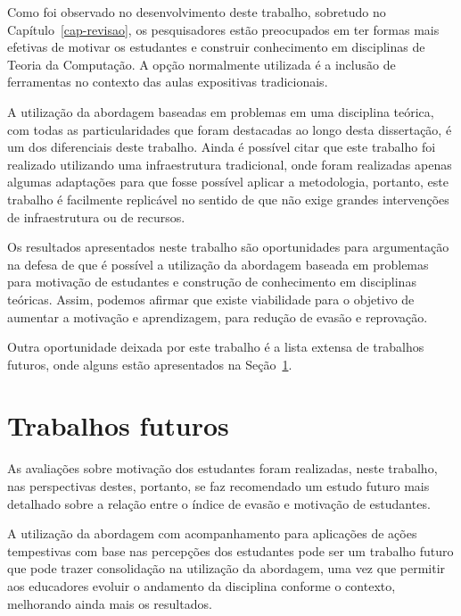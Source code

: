 \label{sec-conclusao}
\acresetall
Como foi observado no desenvolvimento deste trabalho, sobretudo
no Capítulo~\ref{cap-revisao}, 
os pesquisadores estão preocupados em ter formas mais
efetivas de motivar os estudantes e construir conhecimento
em disciplinas de Teoria da Computação.
A opção normalmente utilizada é a inclusão de ferramentas
no contexto das aulas expositivas tradicionais.

A utilização da abordagem baseadas em problemas
em uma disciplina teórica, com todas as
particularidades que foram destacadas ao longo desta
dissertação, é um dos diferenciais deste trabalho.
Ainda é possível citar que este trabalho foi realizado
utilizando uma infraestrutura tradicional, onde foram
realizadas apenas algumas adaptações para que fosse
possível aplicar a metodologia, portanto, este
trabalho é facilmente replicável no sentido de que não exige
grandes intervenções de infraestrutura ou de recursos.

Os resultados apresentados neste trabalho são oportunidades
para argumentação na defesa de que é possível a utilização
da abordagem baseada em problemas para motivação de
estudantes e construção de conhecimento em disciplinas
teóricas.
Assim, podemos afirmar que existe viabilidade para
o objetivo de aumentar a motivação e aprendizagem, para redução
de evasão e reprovação.

Outra oportunidade deixada por este trabalho é
a lista extensa de trabalhos futuros, onde alguns estão
apresentados na Seção~\ref{sec-trab-futuros}.

\section{Trabalhos futuros}
\label{sec-trab-futuros}
As avaliações sobre motivação dos estudantes
foram realizadas, neste trabalho, nas perspectivas
destes, portanto, se faz recomendado um estudo futuro
mais detalhado sobre a relação entre o índice
de evasão e motivação de estudantes.

A utilização da abordagem com acompanhamento
para aplicações de ações tempestivas com base nas
percepções dos estudantes pode ser um trabalho futuro
que pode trazer consolidação na utilização da
abordagem, uma vez que permitir aos educadores evoluir
o andamento da disciplina conforme o contexto,
melhorando ainda mais os resultados.

